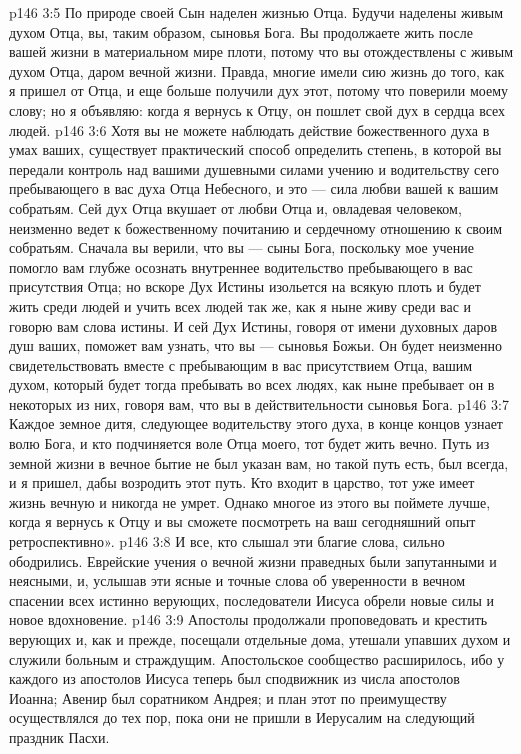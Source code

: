 \vs p146 3:5 По природе своей Сын наделен жизнью Отца. Будучи наделены живым духом Отца, вы, таким образом, сыновья Бога. Вы продолжаете жить после вашей жизни в материальном мире плоти, потому что вы отождествлены с живым духом Отца, даром вечной жизни. Правда, многие имели сию жизнь до того, как я пришел от Отца, и еще больше получили дух этот, потому что поверили моему слову; но я объявляю: когда я вернусь к Отцу, он пошлет свой дух в сердца всех людей.
\vs p146 3:6 Хотя вы не можете наблюдать действие божественного духа в умах ваших, существует практический способ определить степень, в которой вы передали контроль над вашими душевными силами учению и водительству сего пребывающего в вас духа Отца Небесного, и это --- сила любви вашей к вашим собратьям. Сей дух Отца вкушает от любви Отца и, овладевая человеком, неизменно ведет к божественному почитанию и сердечному отношению к своим собратьям. Сначала вы верили, что вы --- сыны Бога, поскольку мое учение помогло вам глубже осознать внутреннее водительство пребывающего в вас присутствия Отца; но вскоре Дух Истины изольется на всякую плоть и будет жить среди людей и учить всех людей так же, как я ныне живу среди вас и говорю вам слова истины. И сей Дух Истины, говоря от имени духовных даров душ ваших, поможет вам узнать, что вы --- сыновья Божьи. Он будет неизменно свидетельствовать вместе с пребывающим в вас присутствием Отца, вашим духом, который будет тогда пребывать во всех людях, как ныне пребывает он в некоторых из них, говоря вам, что вы в действительности сыновья Бога.
\vs p146 3:7 Каждое земное дитя, следующее водительству этого духа, в конце концов узнает волю Бога, и кто подчиняется воле Отца моего, тот будет жить вечно. Путь из земной жизни в вечное бытие не был указан вам, но такой путь есть, был всегда, и я пришел, дабы возродить этот путь. Кто входит в царство, тот уже имеет жизнь вечную и никогда не умрет. Однако многое из этого вы поймете лучше, когда я вернусь к Отцу и вы сможете посмотреть на ваш сегодняшний опыт ретроспективно».
\vs p146 3:8 И все, кто слышал эти благие слова, сильно ободрились. Еврейские учения о вечной жизни праведных были запутанными и неясными, и, услышав эти ясные и точные слова об уверенности в вечном спасении всех истинно верующих, последователи Иисуса обрели новые силы и новое вдохновение.
\vs p146 3:9 \pc Апостолы продолжали проповедовать и крестить верующих и, как и прежде, посещали отдельные дома, утешали упавших духом и служили больным и страждущим. Апостольское сообщество расширилось, ибо у каждого из апостолов Иисуса теперь был сподвижник из числа апостолов Иоанна; Авенир был соратником Андрея; и план этот по преимуществу осуществлялся до тех пор, пока они не пришли в Иерусалим на следующий праздник Пасхи.
